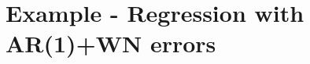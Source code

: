 \documentclass{article}
\begin{document}
%
%

\clearpage

\section{Example - Regression with AR(1)+WN errors} \label{sec:exar}
\end{document}
